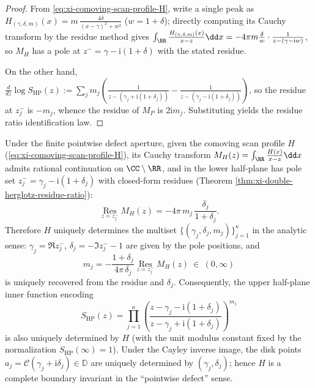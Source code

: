 \begin{proof}
From \eqref{eq:xi-comoving-scan-profile-H}, write a single peak as
\(
H_{(\gamma,\delta,m)}(x)=m\,\frac{4\delta}{(x-\gamma)^2+w^2}
\)
(\(w=1+\delta\)); directly computing its Cauchy transform by the residue method gives
\(
\int_{\RR}\frac{H_{(\gamma,\delta,m)}(x)}{x-z}\dd x
=-4\pi m\frac{\delta}{w}\cdot\frac{1}{z-(\gamma-\mathrm{i}w)}
\),
so \(M_H\) has a pole at \(z^-=\gamma-\mathrm{i}(1+\delta)\) with the stated residue.
\par
On the other hand,
\(
\frac{d}{dz}\log S_{\mathrm{HP}}(z)
:=\sum_{j}m_j\left(\frac{1}{z-(\gamma_j+\mathrm{i}(1+\delta_j))}-\frac{1}{z-(\gamma_j-\mathrm{i}(1+\delta_j))}\right)
\),
so the residue at \(z_j^-\) is \(-m_j\), whence the residue of \(M_P\) is \(2\mathrm{i}m_j\).
Substituting yields the residue ratio identification law. \qedhere
\end{proof}

\begin{corollary}\label{cor:xi-comoving-profile-complete-reconstruction}
Under the finite pointwise defect aperture, given the comoving scan profile \(H\) (\eqref{eq:xi-comoving-scan-profile-H}), its Cauchy transform
\(
M_H(z)=\int_{\RR}\frac{H(x)}{x-z}\dd x
\)
admits rational continuation on \(\CC\setminus\RR\), and in the lower half-plane has pole set
\(
z_j^-=\gamma_j-\mathrm{i}(1+\delta_j)
\)
with closed-form residues (Theorem \ref{thm:xi-double-herglotz-residue-ratio}):
\[
\operatorname*{Res}_{z=z_j^-} M_H(z)= -4\pi\,m_j\,\frac{\delta_j}{1+\delta_j}.
\]
Therefore \(H\) uniquely determines the multiset \(\{(\gamma_j,\delta_j,m_j)\}_{j=1}^{\kappa}\) in the analytic sense:
\(\gamma_j=\Re z_j^-\), \(\delta_j=-\Im z_j^- -1\) are given by the pole positions, and
\begin{equation}\label{eq:xi-comoving-profile-recover-multiplicity-by-residue}
\boxed{\;
m_j
=
-\frac{1+\delta_j}{4\pi\,\delta_j}\operatorname*{Res}_{z=z_j^-} M_H(z)\ \in\ (0,\infty)\;}
\end{equation}
is uniquely recovered from the residue and \(\delta_j\).
Consequently, the upper half-plane inner function encoding
\[
S_{\mathrm{HP}}(z)=\prod_{j=1}^{\kappa}\left(\frac{z-\gamma_j-\mathrm{i}(1+\delta_j)}{z-\gamma_j+\mathrm{i}(1+\delta_j)}\right)^{m_j}
\]
is also uniquely determined by \(H\) (with the unit modulus constant fixed by the normalization \(S_{\mathrm{HP}}(\infty)=1\)).
Under the Cayley inverse image, the disk points
\(
a_j=\mathcal{C}(\gamma_j+\mathrm{i}\delta_j)\in\mathbb{D}
\)
are uniquely determined by \((\gamma_j,\delta_j)\); hence \(H\) is a complete boundary invariant in the ``pointwise defect'' sense.
\end{corollary}

